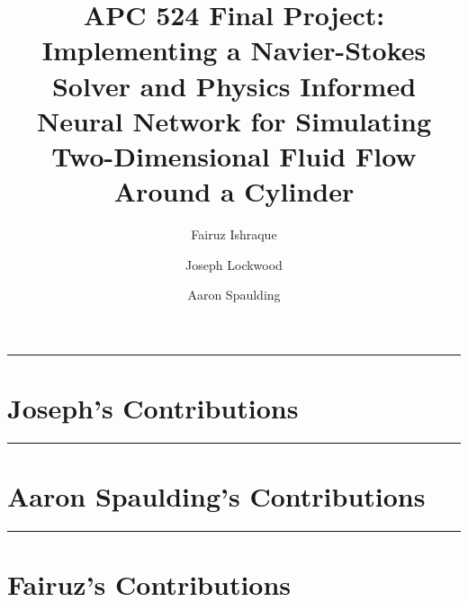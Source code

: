 \documentclass[11pt, letterpaper]{article}
\title{\titlefontlarge APC 524 Final Project:\\\titlefont Implementing a Navier-Stokes Solver and Physics Informed Neural Network for Simulating Two-Dimensional Fluid Flow Around a Cylinder}
\author[1]{Fairuz Ishraque}
\author[1]{Joseph Lockwood}
\author[2]{Aaron Spaulding}
\affil[1]{Department of Geosciences}
\affil[2]{Department of Civil and Environmental Engineering}
\date{}
\begin{document}
\maketitle
\newpage 
\tableofcontents

\newpage
\setcounter{page}{1}



\rule{\linewidth}{0.5pt}
\section{Joseph's Contributions}


\rule{\linewidth}{0.5pt}
\section{Aaron Spaulding's Contributions}


\rule{\linewidth}{0.5pt}
\section{Fairuz's Contributions}


\newpage
\printbibliography
\end{document}
